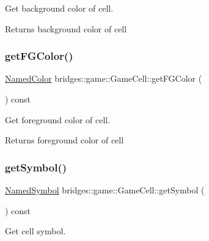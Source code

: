 Get background color of cell. 

\begin{DoxyReturn}{Returns}
background color of cell 
\end{DoxyReturn}
\mbox{\label{classbridges_1_1game_1_1_game_cell_af9269057618ffdd503768ccd6b6e6f56}} 
\subsubsection{\texorpdfstring{get\+F\+G\+Color()}{getFGColor()}}
{\footnotesize\ttfamily \hyperlink{namespacebridges_1_1game_afaa832a4322b25b6a4ebfba832f10f26}{Named\+Color} bridges\+::game\+::\+Game\+Cell\+::get\+F\+G\+Color (\begin{DoxyParamCaption}{ }\end{DoxyParamCaption}) const\hspace{0.3cm}{\ttfamily [inline]}}



Get foreground color of cell. 

\begin{DoxyReturn}{Returns}
foreground color of cell 
\end{DoxyReturn}
\mbox{\label{classbridges_1_1game_1_1_game_cell_a55ed5769afe548a707117379425613f0}} 
\subsubsection{\texorpdfstring{get\+Symbol()}{getSymbol()}}
{\footnotesize\ttfamily \hyperlink{namespacebridges_1_1game_ab9a19c7ab6e2ebac2f95180e21733487}{Named\+Symbol} bridges\+::game\+::\+Game\+Cell\+::get\+Symbol (\begin{DoxyParamCaption}{ }\end{DoxyParamCaption}) const\hspace{0.3cm}{\ttfamily [inline]}}



Get cell symbol. 

